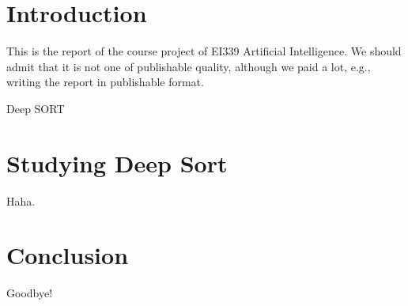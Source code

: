 \documentclass[conference]{IEEEtran}
\begin{document}



\section{Introduction}

This is the report of the course project of EI339 Artificial Intelligence. We should admit that it is not one of publishable quality, although we paid a lot, e.g., writing the report in publishable format.

Deep SORT \cite{Wojke2017simple}

\section{Studying Deep Sort}

Haha.



\section{Conclusion}

Goodbye!



\end{document}
